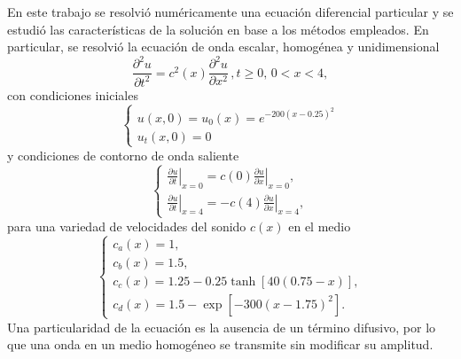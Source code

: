 \documentclass[aps,prb,twocolumn,superscriptaddress,floatfix,longbibliography,10pt]{revtex4-2}
\newcounter{para}
\begin{document}
En este trabajo se resolvió numéricamente una ecuación diferencial particular y se estudió las características de la solución en base a los métodos empleados. En particular, se resolvió la ecuación de onda escalar, homogénea y unidimensional
\begin{equation}
  \frac{\partial^2 u}{\partial t^2} = c^2(x)\frac{\partial^2 u}{\partial x^2} \,, t \geq 0, \,  0 < x < 4,
  \label{eq:ecuacion_ondas}
\end{equation}
con condiciones iniciales
\begin{equation}
  \left\{\begin{matrix}
    u(x,0) = u_0(x) = e^{-200 (x-0.25)^2} \\
    u_t(x,0) = 0
   \end{matrix}\right.
  \label{eq:condiciones_iniciales}
\end{equation}
y condiciones de contorno de onda saliente
\begin{equation}
  \left \{\begin{matrix}
    \left . \frac{\partial u}{\partial t} \right |_{x=0} = c(0) \left . \frac{\partial u}{\partial x} \right |_{x=0} ,\\
    \left . \frac{\partial u}{\partial t} \right |_{x=4} = - c(4) \left . \frac{\partial u}{\partial x} \right |_{x=4},
   \end{matrix}\right .
  \label{eq:condiciones_contorno}
\end{equation}
para una variedad de velocidades del sonido $c(x)$ en el medio
\begin{equation}
\left\{\begin{matrix}
 c_a(x) = 1, \\
 c_b(x) = 1.5, \\
 c_c(x) = 1.25 -0.25 \tanh{[40(0.75-x)]}, \\
 c_d(x) = 1.5 - \exp{[-300(x-1.75)^2]}.
 \end{matrix}\right.
 \label{eq:variedad_velocidades}
\end{equation}
Una particularidad de la ecuación es la ausencia de un término difusivo, por lo que una onda en un medio homogéneo se transmite sin modificar su amplitud.

\end{document}
